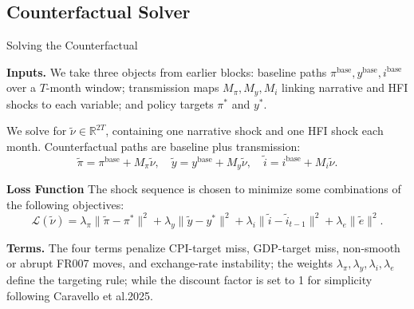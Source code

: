 \documentclass[10pt,aspectratio=169,t]{beamer}
\begin{document}
\subsection{Counterfactual Solver}

\begin{frame}{Solving the Counterfactual}
\small

\textbf{Inputs.} We take three objects from earlier blocks: baseline paths
$\pi^{\text{base}}, y^{\text{base}}, i^{\text{base}}$ over a $T$-month window;
transmission maps $M_\pi, M_y, M_i$ linking narrative and HFI shocks to each variable;
and policy targets $\pi^*$ and $y^*$.

\vspace{0.25em}
We solve for
$\tilde\nu \in \mathbb{R}^{2T}$, containing one narrative shock and one HFI shock each month.
Counterfactual paths are baseline plus transmission:
\[
\tilde\pi = \pi^{\text{base}} + M_\pi\tilde\nu, \quad
\tilde y = y^{\text{base}} + M_y\tilde\nu, \quad
\tilde i = i^{\text{base}} + M_i\tilde\nu.
\]


\textbf{Loss Function} The shock sequence is chosen to minimize some combinations of the following objectives:
\[
\mathcal{L}(\tilde\nu)
= \lambda_\pi \|\tilde\pi - \pi^*\|^2
+ \lambda_y \|\tilde y - y^*\|^2
+ \lambda_i \|\tilde i - \tilde i_{t-1}\|^2
+ \lambda_e \|\tilde e\|^2.
\]


\textbf{Terms.} The four terms penalize CPI-target miss, GDP-target miss, non-smooth or abrupt FR007 moves, and exchange-rate instability; the weights $\lambda_\pi,\lambda_y,\lambda_i,\lambda_e$ define the targeting rule; while the discount factor is set to 1 for simplicity following Caravello et al.2025.

\end{frame}
\end{document}
